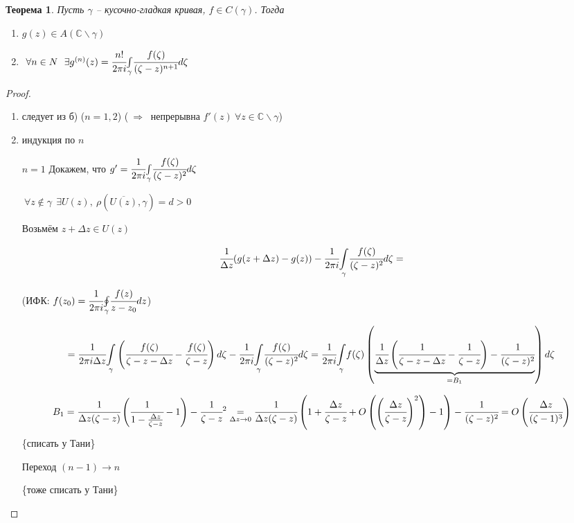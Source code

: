 \documentclass[draft]{report}
\newcommand{\forcenewline}{$\phantom{\mbox{newline}}$\newline}
\newcommand{\then}{\ \Rightarrow\ }
\renewcommand{\C}{\mathbb{C}}
\newcommand{\mint}[2]{\underset{#1}{\overset{#2}{\int}}}
\newcommand{\moint}[1]{\underset{#1}{\oint}}
\newcommand{\g}{\gamma}
\newcommand{\D}{\Delta}
\newcommand{\E}{\ \exists}
\newcommand{\F}{\ \forall}
\newtheorem*{theor}{Теорема}
\theoremstyle{remark}
\begin{document}
\begin{theor}
Пусть $\g$ -- кусочно-гладкая кривая, $f\in C(\g)$. Тогда
\begin{enumerate}
\item[а)] $g(z)\in A(\C\smallsetminus\g)$
\item[б)] $\F n\in N\ \E g^{(n)}(z)=\cfrac{n!}{2\pi i}\mint{\g}{}\cfrac{f(\zeta)}{(\zeta-z)^{n+1}}d\zeta$
\end{enumerate}
\end{theor}
\begin{proof}
\forcenewline
\begin{enumerate}
\item[а)] следует из б) ($n=1,2$) ($\then$ непрерывна $f'(z)\F z\in \C\smallsetminus\g$)
\item[б)] индукция по $n$

$n=1$ Докажем, что $g'=\cfrac{1}{2\pi i}\mint{\g}{}\cfrac{f(\zeta)}{(\zeta-z)^{2}}d\zeta$

$\F z\notin\g\ \E U(z),\ \rho(\overline{U(z)},\g)=d>0$

Возьмём $z+\D z\in U(z)$

$$\cfrac1{\D z}(g(z+\D z)-g(z))-\cfrac{1}{2\pi i}\mint{\g}{}\cfrac{f(\zeta)}{(\zeta-z)^{2}}d\zeta=$$

(ИФК: $f(z_0)=\cfrac{1}{2\pi i}\moint{\g}{}\cfrac{f(z)}{z-z_0}dz$)

$$=\cfrac1{2\pi i\D z}\mint{\g}{}\left(\cfrac{f(\zeta)}{\zeta-z-\D z}-\cfrac{f(\zeta)}{\zeta-z}\right)d\zeta-\cfrac{1}{2\pi i}\mint{\g}{}\cfrac{f(\zeta)}{(\zeta-z)^{2}}d\zeta=\cfrac1{2\pi i}\mint{\g}{}f(\zeta)\left(\underset{=B_1}{\underbrace{\cfrac1{\D z}\left(\cfrac1{\zeta-z-\D z}-\cfrac1{\zeta-z}\right)-\cfrac1{(\zeta-z)^2}}}\right)d\zeta$$

$$B_1=\cfrac1{\D z(\zeta-z)}\left(\cfrac1{1-\frac{\D z}{\zeta-z}}-1\right)-\cfrac1{\zeta-z}^2\underset{\D z\to 0}{=}\cfrac1{\D z(\zeta-z)}\left(1+\cfrac{\D z}{\zeta-z}+O\left(\left(\cfrac{\D z}{\zeta-z}\right)^2\right)-1\right)-\cfrac1{(\zeta-z)^2}=O\left(\cfrac{\D z}{(\zeta-1)^3}\right)$$
\{списать у Тани\} %

Переход $(n-1)\to n$

\{тоже списать у Тани\}
\end{enumerate}
\end{proof}

\subsection{}
\end{document}
